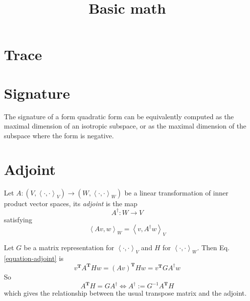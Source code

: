 



\title{Basic math}
\maketitle

\label{section-phantom}

\tableofcontents

\section{Trace}
\label{section-trace}

\begin{proposition}
\label{proposition-trace-is-coordinate-independent}

\end{proposition}

\section{Signature}
\label{section-signature}

The signature of a form quadratic form can be equivalently computed as the
maximal dimension of an isotropic subspace, or as the maximal dimension of the
subspace where the form is negative.

\section{Adjoint}
\label{section-adjoint}

\begin{definition}
\label{definition-adjoint}
Let  $A:(V,\left<\cdot,\cdot\right>_V) \to (W,\left<\cdot,\cdot\right>_W)$ be a 
linear transformation of inner product vector spaces, its {\it adjoint} is the
map
$$
A^{\dag}:W\to V
$$
satisfying
\begin{equation}
\label{equation-adjoint}
\left<Av,w\right>_W=\left<v,A^\dag w\right>_V
\end{equation}
\end{definition}

Let $G$ be a matrix representation for $\left<\cdot,\cdot\right>_V$ and $H$ for
$\left<\cdot,\cdot\right>_W$. Then Eq. \ref{equation-adjoint} is
$$
v^{\mathbf{T}}A^{\mathbf{T}}Hw=(Av)^{\mathbf{T}}Hw=v^{\mathbf{T}}GA^\dag w
$$
So
\begin{equation}
\label{equation-adjoint-transpose}
A^{\mathbf{T}}H=GA^\dag \iff A^\dag:=G^{-1}A^{\mathbf{T}}H
\end{equation}
which gives the relationship between the usual transpose matrix and the adjoint.

